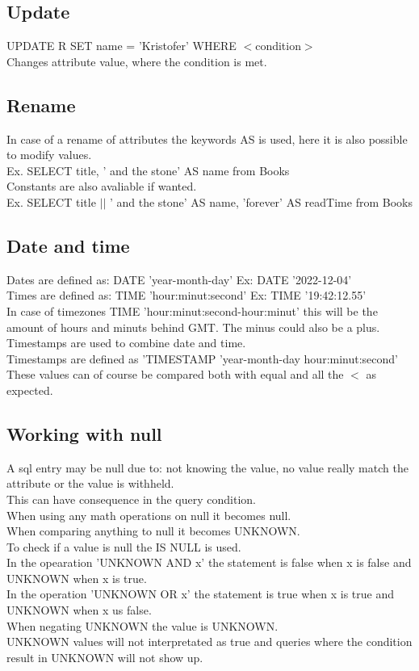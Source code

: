 \documentclass[12pt, a4paper]{article}
\begin{document}
			\subsection{Update}
				UPDATE R SET name = 'Kristofer' WHERE $<$condition$>$\\
				Changes attribute value, where the condition is met.
		\subsection{Rename}
			In case of a rename of attributes the keywords AS is used, here it is also possible to modify values.\\
			Ex. SELECT title, ' and the stone' AS name from Books\\
			Constants are also avaliable if wanted.\\
			Ex. SELECT title $||$ ' and the stone' AS name, 'forever' AS readTime from Books\\
		\subsection{Date and time}
			Dates are defined as: DATE 'year-month-day' Ex: DATE '2022-12-04'\\
			Times are defined as: TIME 'hour:minut:second' Ex: TIME '19:42:12.55'\\
			In case of timezones TIME 'hour:minut:second-hour:minut' this will be the amount of hours and minuts behind GMT. The minus could also be a plus.\\
			Timestamps are used to combine date and time.\\
			Timestamps are defined as 'TIMESTAMP 'year-month-day hour:minut:second'\\
			These values can of course be compared both with equal and all the $<$ as expected.
		\subsection{Working with null}
			A sql entry may be null due to: not knowing the value, no value really match the attribute or the value is withheld.\\
			This can have consequence in the query condition.\\
			When using any math operations on null it becomes null.\\
			When comparing anything to null it becomes UNKNOWN.\\
			To check if a value is null the IS NULL is used.\\
			In the opearation 'UNKNOWN AND x' the statement is false when x is false and UNKNOWN when x is true.\\
			In the operation 'UNKNOWN OR x' the statement is true when x is true and UNKNOWN when x us false.\\
			When negating UNKNOWN the value is UNKNOWN.\\
			UNKNOWN values will not interpretated as true and queries where the condition result in UNKNOWN will not show up.\\
\end{document}
